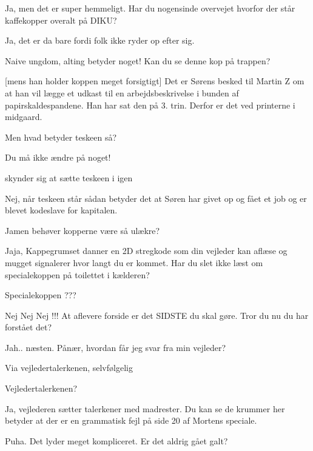 \documentclass[a4paper,11pt]{article}
\begin{document}
\begin{sketch}
 Ja, men det er super hemmeligt. Har du nogensinde overvejet hvorfor der står kaffekopper overalt på DIKU?

 Ja, det er da bare fordi folk ikke ryder op efter sig.

 Naive ungdom, alting betyder noget! Kan du se denne kop på
trappen? 

 [mens han holder koppen meget forsigtigt] Det er Sørens besked
til Martin Z om at han vil lægge et udkast til en arbejdsbeskrivelse i bunden af
papirskaldespandene. Han har sat den på 3. trin. Derfor er det ved
printerne i midgaard.

  Men hvad betyder teskeen så?

 Du må ikke ændre på noget!

 skynder sig at sætte teskeen i igen

 Nej, når teskeen står sådan betyder det at Søren har givet op og
fået et job og er blevet kodeslave for kapitalen.


 Jamen behøver kopperne være så ulækre?

 Jaja, Kappegrumset danner en 2D stregkode som din vejleder kan
aflæse og mugget signalerer hvor langt du er kommet. Har du slet ikke læst om specialekoppen på toilettet i kælderen?

 Specialekoppen ???



 Nej Nej Nej !!! At aflevere forside er det SIDSTE du skal gøre. Tror du nu du har forstået det?

 Jah.. næsten. Pånær, hvordan får jeg svar fra min vejleder?

 Via vejledertalerkenen, selvfølgelig

 Vejledertalerkenen?

 Ja, vejlederen sætter talerkener med madrester. Du kan se de
krummer her betyder at der er en grammatisk fejl på side 20 af Mortens
speciale.

 Puha. Det lyder meget kompliceret. Er det aldrig gået galt?


\end{sketch}
\end{document}
